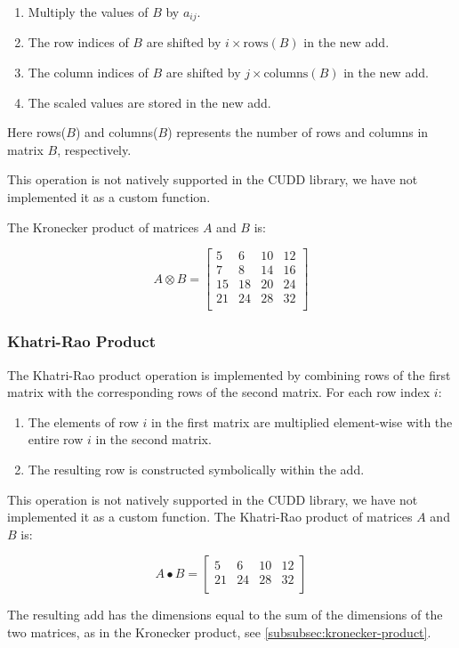 \begin{enumerate}
    \item Multiply the values of $B$ by $a_{ij}$.
    \item The row indices of $B$ are shifted by $i \times \text{rows}(B)$ in the new \gls{add}.
    \item The column indices of $B$ are shifted by $j \times \text{columns}(B)$ in the new \gls{add}.
    \item The scaled values are stored in the new \gls{add}.
\end{enumerate}

Here rows($B$) and columns($B$) represents the number of rows and columns in matrix $B$, respectively.

This operation is not natively supported in the CUDD library, we have not implemented it as a custom function.

The Kronecker product of matrices $A$ and $B$ is:

\[
    A \otimes B = \begin{bmatrix}
                      5  & 6  & 10 & 12 \\
                      7  & 8  & 14 & 16 \\
                      15 & 18 & 20 & 24 \\
                      21 & 24 & 28 & 32 \\
    \end{bmatrix}
\]

\subsubsection{Khatri-Rao Product}
The Khatri-Rao product operation is implemented by combining rows of the first matrix with the corresponding rows of the second matrix.
For each row index $i$:

\begin{enumerate}
    \item The elements of row $i$ in the first matrix are multiplied element-wise with the entire row $i$ in the second matrix.
    \item The resulting row is constructed symbolically within the \gls{add}.
\end{enumerate}

This operation is not natively supported in the CUDD library, we have not implemented it as a custom function.
The Khatri-Rao product of matrices $A$ and $B$ is:

\[
    A \bullet B = \begin{bmatrix}
                      5  & 6  & 10 & 12 \\
                      21 & 24 & 28 & 32 \\
    \end{bmatrix}
\]

The resulting \gls{add} has the dimensions equal to the sum of the dimensions of the two matrices, as in the Kronecker product, see \autoref{subsubsec:kronecker-product}.
